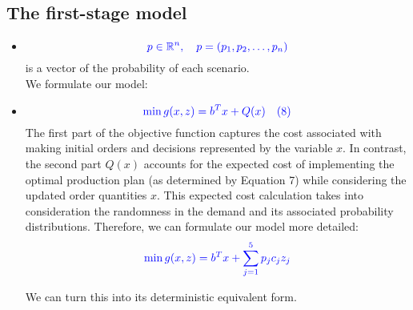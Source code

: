 \documentclass[a4paper]{article}
\begin{document}
	\subsection{The first-stage model}
	\begin{itemize}
		In this first-stage section, we will only consider the case production is \textcolor{red}{always less or equal to demand}.
		The first stage is the initial phase of decision-making in a stochastic programming problem. The decision variable 
		\[
		\textcolor{blue}{
			x \in \mathbb{R}^m, \quad x = (x_1, x_2, \ldots, x_m)
		}
		\] representing the number of parts to be ordered before production. Some additional vectors have to be declared:
		\[
		\textcolor{blue}{
			b \in \mathbb{R}^m, \quad b = (b_1, b_2, \ldots, b_m)
		}
		\]acts as the pre-order cost of each part
		\item 
		\[
		\textcolor{blue}{
			p \in \mathbb{R}^n, \quad p = (p_1, p_2, \ldots, p_n)
		}
		\]is a vector of the probability of each scenario.\\
		We formulate our model:
		\item 
		\[
		\textcolor{blue}{
			\min g(x,z) = b^T x + Q(x) \quad (8)
		}
		\]
		The first part of the objective function captures the cost associated with making initial orders and decisions represented by the variable \(x\). In contrast, the second part \(Q(x)\) accounts for the expected cost of implementing the optimal production plan (as determined by Equation 7) while considering the updated order quantities \(x\). This expected cost calculation takes into consideration the randomness in the demand and its associated probability distributions. Therefore, we can formulate our model more detailed:
		\[
		\textcolor{blue}{
			\min g(x,z) = b^T x + \sum_{j=1}^5 p_j c_j z_j
		}
		\]
		
		We can turn this into its deterministic equivalent form.
	\end{itemize}
\end{document}
